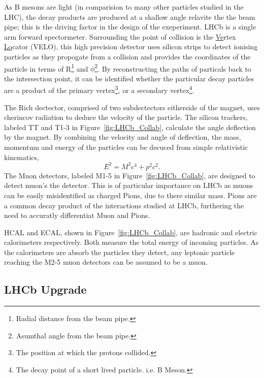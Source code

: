     As B mesons are light (in comparision to many other particles studied in the LHC), the decay products are produced at a shallow angle relavite the the beam pipe;
    this is the driving factor in the design of the exeperiment. 
    LHCb is a single arm forward spectormeter.
    Surrounding the point of collision is the \underline{Ve}rtex \underline{Lo}cator (VELO), this high precision detector uses silicon strips to detect ionising particles as they propogate from a collision and provides the coordinates of the particle in terms of R\footnote{Radial distance from the beam pipe.} and $\phi$\footnote{Asumthal angle from the beam pipe.}.
    By reconstructing the paths of particals back to the intersection point, it can be identified whether the particular decay particles are a product of the primary vertex\footnote{The position at which the protons collided.}, or a secondary vertex\footnote{The decay point of a short lived particle. i.e. B Meson.}.
    \par
    The Rich dectector, comprised of two subdectectors eitherside of the magnet, uses cherincov radiation to deduce the velocity of the particle. The silicon trackers, labeled TT and T1-3 in Figure~\ref{fig:LHCb_Collab}, calculate the angle deflection by the magnet. 
    By combining the velocity and angle of deflection, the mass, momentum and energy of the particles can be decuced from simple relativistic kinematics,
    \begin{equation}
      E^2 = M^2c^4 + p^2c^2.
    \end{equation}
    The Muon detectors, labeled M1-5 in Figure~\ref{fig:LHCb_Collab}, are designed to detect muon's the detector. 
    This is of particular importance on LHCb as muons can be easily misidentified as charged Pions, due to there similar mass.
    Pions are a common decay product of the interactions studied at LHCb, furthering the need to accuratly differentiat Muon and Pions.
    \par
    HCAL and ECAL, shown in Figure~\ref{fig:LHCb_Collab}, are hadronic and electric calorimeters respectively. 
    Both measure the total energy of incoming particles.
    As the calorimeters are absorb the particles they detect, any leptonic particle reaching the M2-5 muon detectors can be assumed to be a muon.

  \subsection{LHCb Upgrade} %
  \label{sub:lhcb_upgrade}

